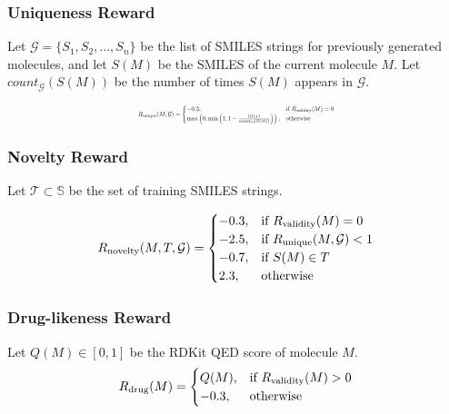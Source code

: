 \documentclass[conference]{IEEEtran}
\begin{document}
\subsubsection{Uniqueness Reward}
\textnormal{Let $\mathcal{G} = \{S_1, S_2,...,S_n\}$ be the list of SMILES strings for previously generated molecules, and let
$S(M)$ be the SMILES of the current molecule $M$. Let $count_{\mathcal{G}}(S(M))$ be the number of times $S(M)$
appears in $\mathcal{G}$.}

\small{
    \begin{equation}
        \resizebox{0.45\textwidth}{!}{$
            R_{\textnormal{unique}}(M, \mathcal{G}) =
            \begin{cases}
                -0.3, & \textnormal{if } R_{\textnormal{validity}}(M) = 0 \\
                \max\left(0, \min\left(1, 1 - \frac{|G| + 1}{\textnormal{count}_G(S(M))} \right) \right), & \textnormal{otherwise}
            \end{cases}
        $}
        \label{eq:uniqueness}
    \end{equation}
}

\subsubsection{Novelty Reward}
\textnormal{Let $\mathcal{T} \subset \mathbb{S}$ be the set of training SMILES strings.}

\small{
    \begin{equation}
        R_{\textnormal{novelty}}(M, T, \mathcal{G}) =
        \begin{cases}
            -0.3, & \textnormal{if } R_{\textnormal{validity}}(M) = 0 \\
            -2.5, & \textnormal{if } R_{\textnormal{unique}}(M, \mathcal{G}) < 1 \\
            -0.7, & \textnormal{if } S(M) \in T \\
            2.3, & \textnormal{otherwise}
        \end{cases}
        \label{eq:novelty}
    \end{equation}        
}

\subsubsection{Drug-likeness Reward}
\textnormal{Let $Q(M) \in [0, 1]$ be the RDKit QED score of molecule $M$.}
\small{
    \begin{equation}
        R_{\textnormal{drug}}(M) = \begin{cases}
            Q(M), & \textnormal{if } R_{\textnormal{validity}}(M) > 0 \\
            -0.3, & \textnormal{otherwise}
        \end{cases}
        \label{eq:drug}
    \end{equation}
}
\end{document}
